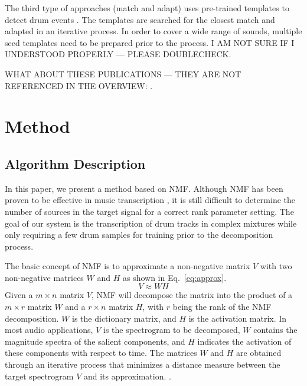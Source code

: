 \documentclass{article}
\begin{document}
The third type of approaches (match and adapt) uses pre-trained templates to detect drum events \cite{yoshii_drum_2007}. The templates are searched for the closest match and adapted in an iterative process. In order to cover a wide range of sounds, multiple seed templates need to be prepared prior to the process. I AM NOT SURE IF I UNDERSTOOD PROPERLY --- PLEASE DOUBLECHECK.
 
WHAT ABOUT THESE PUBLICATIONS --- THEY ARE NOT REFERENCED IN THE OVERVIEW: \cite{yoshii_automatic_2004,dittmar_drum_2005,dittmar_further_2004,scholler_sparse_2011}.
\section{Method}\label{sec:method}
\subsection{Algorithm Description}\label{subsec:algorithm description}

In this paper, we present a method based on NMF. Although NMF has been proven to be effective in music transcription \cite{smaragdis_non-negative_2003}, it is still difficult to determine the number of sources in the target signal for a correct rank parameter setting. The goal of our system is the transcription of drum tracks in complex mixtures while only requiring a few drum samples for training prior to the decomposition process. 

The basic concept of NMF is to approximate a non-negative matrix $V$ with two non-negative matrices $W$ and $H$ as shown in Eq.~\eqref{eq:approx}.
\begin{equation}
V \approx WH
\label{eq:approx}
\end{equation}
Given a $m \times n$ matrix $V$, NMF will decompose the matrix into the product of a $m \times r$ matrix $W$ and a $r \times n$ matrix $H$, with $r$ being the rank of the NMF decomposition. $W$ is the dictionary matrix, and $H$ is the activation matrix. In most audio applications, $V$ is the spectrogram to be decomposed, $W$ contains the magnitude spectra of the salient components, and $H$ indicates the activation of these components with respect to time. The matrices $W$ and $H$ are obtained through an iterative process that minimizes a distance measure between the target spectrogram $V$ and its approximation. \cite{lee_algorithms_2000}. 
\end{document}
